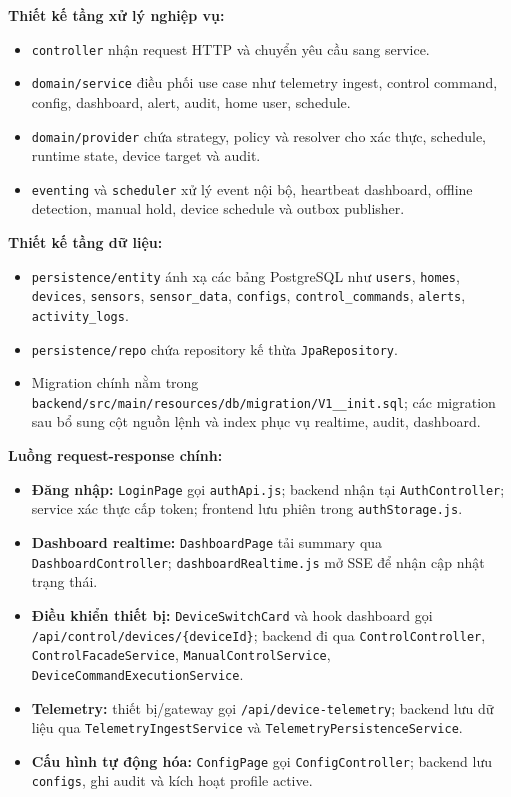 \textbf{Thiết kế tầng xử lý nghiệp vụ:}
\begin{itemize}
    \item \texttt{controller} nhận request HTTP và chuyển yêu cầu sang service.
    \item \texttt{domain/service} điều phối use case như telemetry ingest, control command, config, dashboard, alert, audit, home user, schedule.
    \item \texttt{domain/provider} chứa strategy, policy và resolver cho xác thực, schedule, runtime state, device target và audit.
    \item \texttt{eventing} và \texttt{scheduler} xử lý event nội bộ, heartbeat dashboard, offline detection, manual hold, device schedule và outbox publisher.
\end{itemize}

\textbf{Thiết kế tầng dữ liệu:}
\begin{itemize}
    \item \texttt{persistence/entity} ánh xạ các bảng PostgreSQL như \texttt{users}, \texttt{homes}, \texttt{devices}, \texttt{sensors}, \texttt{sensor\_data}, \texttt{configs}, \texttt{control\_commands}, \texttt{alerts}, \texttt{activity\_logs}.
    \item \texttt{persistence/repo} chứa repository kế thừa \texttt{JpaRepository}.
    \item Migration chính nằm trong \texttt{backend/src/main/resources/db/migration/V1\_\_init.sql}; các migration sau bổ sung cột nguồn lệnh và index phục vụ realtime, audit, dashboard.
\end{itemize}

\textbf{Luồng request-response chính:}
\begin{itemize}
    \item \textbf{Đăng nhập:} \texttt{LoginPage} gọi \texttt{authApi.js}; backend nhận tại \texttt{AuthController}; service xác thực cấp token; frontend lưu phiên trong \texttt{authStorage.js}.
    \item \textbf{Dashboard realtime:} \texttt{DashboardPage} tải summary qua \texttt{DashboardController}; \texttt{dashboardRealtime.js} mở SSE để nhận cập nhật trạng thái.
    \item \textbf{Điều khiển thiết bị:} \texttt{DeviceSwitchCard} và hook dashboard gọi \texttt{/api/control/devices/\{deviceId\}}; backend đi qua \texttt{ControlController}, \texttt{ControlFacadeService}, \texttt{ManualControlService}, \texttt{DeviceCommandExecutionService}.
    \item \textbf{Telemetry:} thiết bị/gateway gọi \texttt{/api/device-telemetry}; backend lưu dữ liệu qua \texttt{TelemetryIngestService} và \texttt{TelemetryPersistenceService}.
    \item \textbf{Cấu hình tự động hóa:} \texttt{ConfigPage} gọi \texttt{ConfigController}; backend lưu \texttt{configs}, ghi audit và kích hoạt profile active.
\end{itemize}

